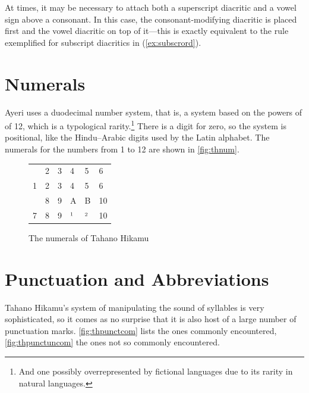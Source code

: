 At times, it may be necessary to attach both a superscript diacritic and a 
vowel sign above a consonant. In this case, the consonant-modifying diacritic 
is placed first and the vowel diacritic on top of it---this is exactly 
equivalent to the rule exemplified for subscript diacritics in 
(\ref{ex:subscrord}).


\section{Numerals}

Ayeri uses a duodecimal number system, that is, a system based on the powers of
of 12, which is a typological rarity.\footnote{And one possibly overrepresented 
by fictional languages due to its rarity in natural languages.} There is a 
digit for zero, so the system is positional, like the Hindu–Arabic digits used 
by the Latin alphabet. The numerals for the numbers from 1 to 12 are shown in 
\autoref{fig:thnum}.

\begin{figure}[ht]
\caption{The numerals of Tahano Hikamu}

\begin{tabu} to \linewidth{X[c] X[c] X[c] X[c] X[c] X[c]}
\toprule
{} & 2 & 3 & 4 & 5 & 6 \\
\rowfont{\Tagati\huge}	1 & 2 & 3 & 4 & 5 & 6 \\

\midrule

 & 8 & 9 & A & B & 10 \\
\rowfont{\Tagati\huge}	7 & 8 & 9 & ¹ & ² & 10 \\

\bottomrule
\end{tabu}
\label{fig:thnum}
\end{figure}



\section{Punctuation and Abbreviations}

Tahano Hikamu's system of manipulating the sound of syllables is very 
sophisticated, so it comes as no surprise that it is also host of a large 
number of punctuation marks. \autoref{fig:thpunctcom} lists the ones commonly 
encountered, \autoref{fig:thpunctuncom} the ones not so commonly encountered.

